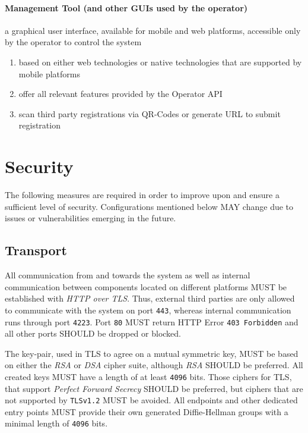 \documentclass[12pt,english,a4paper,titlepage,cleardoublepage=empty,dottedtoc]{report}
\providecommand{\tightlist}{%
  \setlength{\itemsep}{0pt}\setlength{\parskip}{0pt}}
\begin{document}
\paragraph{Management Tool (and other GUIs used by the
operator)}\label{management-tool-and-other-guis-used-by-the-operator}

a graphical user interface, available for mobile and web platforms,
accessible only by the operator to control the system

\begin{enumerate}
\def\labelenumi{\alph{enumi})}
\tightlist
\item
  based on either web technologies or native technologies that are
  supported by mobile platforms
\item
  offer all relevant features provided by the Operator API
\item
  scan third party registrations via QR-Codes or generate URL to submit
  registration
\end{enumerate}

\section{Security}\label{security}

The following measures are required in order to improve upon and ensure
a sufficient level of security. Configurations mentioned below MAY
change due to issues or vulnerabilities emerging in the future.

\subsection{Transport}\label{transport}

All communication from and towards the system as well as internal
communication between components located on different platforms MUST be
established with \emph{HTTP over TLS}. Thus, external third parties are
only allowed to communicate with the system on port \texttt{443},
whereas internal communication runs through port \texttt{4223}. Port
\texttt{80} MUST return HTTP Error \texttt{403\ Forbidden} and all other
ports SHOULD be dropped or blocked.

The key-pair, used in TLS to agree on a mutual symmetric key, MUST be
based on either the \emph{RSA} or \emph{DSA} cipher suite, although
\emph{RSA} SHOULD be preferred. All created keys MUST have a length of
at least \texttt{4096} bits. Those ciphers for TLS, that support
\emph{Perfect Forward Secrecy} SHOULD be preferred, but ciphers that are
not supported by \texttt{TLSv1.2} MUST be avoided. All endpoints and
other dedicated entry points MUST provide their own generated
Diffie-Hellman groups with a minimal length of \texttt{4096} bits.
\end{document}
